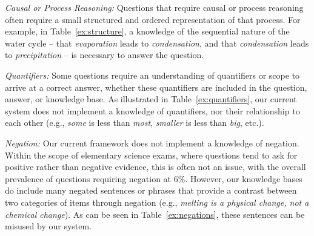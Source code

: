 {\flushleft \emph{Causal or Process Reasoning: }} 
Questions that require causal or process reasoning often require a small structured and ordered representation of that process.  For example, in Table~\ref{ex:structure}, a knowledge of the sequential nature of the water cycle -- that \emph{evaporation} leads to \emph{condensation}, and that \emph{condensation} leads to \emph{precipitation} -- is necessary to answer the question. 

{\flushleft \emph{Quantifiers: }} Some questions require an understanding of quantifiers or scope to arrive at a correct answer, whether these quantifiers are included in the question, answer, or knowledge base.  As illustrated in Table~\ref{ex:quantifiers}, our current system does not implement a knowledge of quantifiers, nor their relationship to each other (e.g., \emph{some} is less than \emph{most}, \emph{smaller} is less than \emph{big}, etc.). 

{\flushleft \emph{Negation: }} Our current framework does not implement a knowledge of negation.  Within the scope of elementary science exams, where questions tend to ask for positive rather than negative evidence, this is often not an issue, with the overall prevalence of questions requiring negation at 6\%.  However, our knowledge bases do include many negated sentences or phrases that provide a contrast between two categories of items through negation (e.g., \emph{melting is a physical change, not a chemical change}). As can be seen in Table~\ref{ex:negations}, these sentences can be misused by our system. 


 
